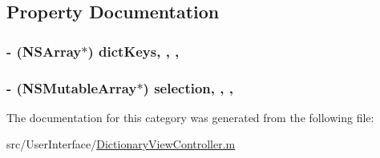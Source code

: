 \subsection{Property Documentation}
\hypertarget{category_dictionary_view_controller_07_08_afa19f41b17e761bbbd9d3217f0d93283}{
\subsubsection[{dict\-Keys}]{\setlength{\rightskip}{0pt plus 5cm}-\/ (N\-S\-Array$\ast$) dict\-Keys\hspace{0.3cm}{\ttfamily [read]}, {\ttfamily [write]}, {\ttfamily [atomic]}, {\ttfamily [retain]}}}\label{category_dictionary_view_controller_07_08_afa19f41b17e761bbbd9d3217f0d93283}
\hypertarget{category_dictionary_view_controller_07_08_aa72b3a5a83d00a2e0730daf4cda357ee}{
\subsubsection[{selection}]{\setlength{\rightskip}{0pt plus 5cm}-\/ (N\-S\-Mutable\-Array$\ast$) selection\hspace{0.3cm}{\ttfamily [read]}, {\ttfamily [write]}, {\ttfamily [atomic]}, {\ttfamily [retain]}}}\label{category_dictionary_view_controller_07_08_aa72b3a5a83d00a2e0730daf4cda357ee}


The documentation for this category was generated from the following file\-:\begin{DoxyCompactItemize}
\item 
src/\-User\-Interface/\hyperlink{_dictionary_view_controller_8m}{Dictionary\-View\-Controller.\-m}\end{DoxyCompactItemize}
